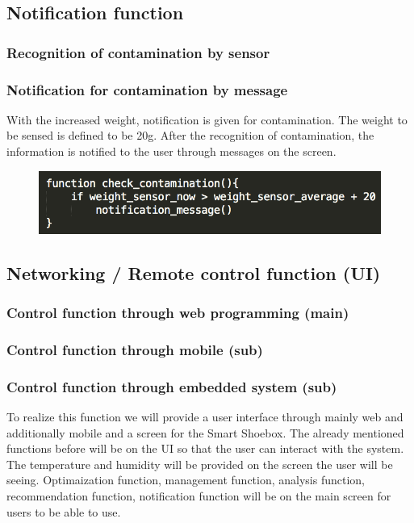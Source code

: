 \documentclass[conference]{IEEEtran}
\begin{document}
\subsection{Notification function}
\subsubsection{Recognition of contamination by sensor}
\subsubsection{Notification for contamination by message}
With the increased weight, notification is given for contamination. The weight to be sensed is defined to be 20g.
After the recognition of contamination, the information is notified to the user through messages on the screen.
\begin{figure}[H]
\begin{center}
    \includegraphics[scale=0.6]{notification1}
    \label{fig:label}
\end{center}
\end{figure}

\subsection{Networking / Remote control function (UI)}
\subsubsection{Control function through web programming (main)}
\subsubsection{Control function through mobile (sub)}
\subsubsection{Control function through embedded system (sub)}
To realize this function we will provide a user interface through mainly web and additionally mobile and a screen for the Smart Shoebox. The already mentioned functions before will be on the UI so that the user can interact with the system. The temperature and humidity will be provided on the screen the user will be seeing. Optimaization function, management function, analysis function, recommendation function, notification function will be on the main screen for users to be able to use. 
\end{document}
